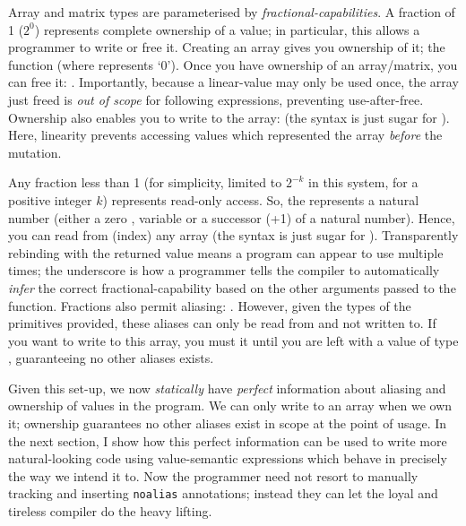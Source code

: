 Array and matrix types are parameterised by \emph{fractional-capabilities}.  A
fraction of 1 ($2^0$) represents complete ownership of a value; in
particular, this allows a programmer to write or free it. Creating an array
gives you ownership of it; the function 
(where  represents `0'). Once you have ownership of an
array/matrix, you can free it: .
Importantly, because a linear-value may only be used once, the array just freed
is \emph{out of scope} for following expressions, preventing use-after-free.
Ownership also enables you to write to the array:  (the syntax  is just
sugar for ). Here, linearity prevents accessing values
which represented the array \emph{before} the mutation.

Any fraction less than 1 (for simplicity, limited to $2^{-k}$ in this system,
for a positive integer $k$) represents read-only access. So, the 
represents a natural number (either a zero , variable  or a
successor (+1) of a natural number). Hence, you can read from (index) any array
 (the syntax  is just sugar for ). Transparently
rebinding  with the returned value means a program can appear to use
 multiple times; the underscore is how a programmer tells the compiler
to automatically \emph{infer} the correct fractional-capability based on the
other arguments passed to the function. Fractions also permit aliasing:
. However, given the types
of the primitives provided, these aliases can only be read from and not written
to. If you want to write to this array, you must  it until you are left with a value of type , guaranteeing no other aliases exists.

Given this set-up, we now \emph{statically} have \emph{perfect} information
about aliasing and ownership of values in the program. We can only write to an
array when we own it; ownership guarantees no other aliases exist in scope at
the point of usage. In the next section, I show how this perfect information
can be used to write more natural-looking code using value-semantic expressions
which behave in precisely the way we intend it to. Now the programmer need not
resort to manually tracking and inserting \texttt{noalias} annotations; instead
they can let the loyal and tireless compiler do the heavy lifting.

